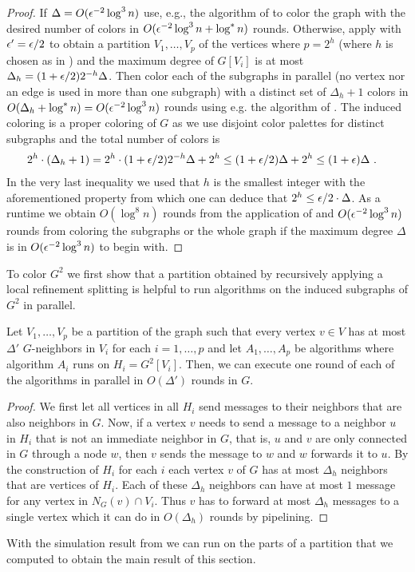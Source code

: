 \begin{proof}
If $\Delta=O(\epsilon^{-2}\log^3 n)$ use, e.g., the algorithm of \cite{BEG18} to color the graph with the desired number of colors in $O(\epsilon^{-2}\log^3 n+\log^* n)$ rounds.
Otherwise, apply  with $\epsilon'=\epsilon/2$ to obtain a partition $V_1,\ldots,V_p$ of the vertices where $p=2^h$ (where $h$ is chosen as in ) and the maximum degree of $G[V_i]$ is at most $\Delta_h=(1+\epsilon/2)2^{-h}\Delta$. 
Then color each of the subgraphs in parallel (no vertex nor an edge is used in more than one subgraph) with a distinct set of $\Delta_h+1$ colors in $O(\Delta_h+\log^* n)=O(\epsilon^{-2}\log^3 n)$ rounds using e.g. the algorithm of \cite{BEG18}. The induced coloring is a proper coloring of $G$ as we use disjoint color palettes for distinct subgraphs and the total number of colors is
\begin{align}
2^h\cdot (\Delta_h+1) & =2^h\cdot (1+\epsilon/2)2^{-h}\Delta+2^h\leq (1+\epsilon/2)\Delta+2^h\leq  (1+\epsilon)\Delta~.
\end{align}
In the very last inequality we used that $h$ is the smallest integer with the aforementioned property from which one can deduce that
$2^h\leq \epsilon/2\cdot \Delta$.
As a runtime we obtain $O(\log^8 n)$ rounds from the application of  and $O(\epsilon^{-2}\log^3 n)$ rounds from coloring the subgraphs or the whole graph if the maximum degree $\Delta$ is in $O(\epsilon^{-2}\log^3 n)$ to begin with.
\end{proof}

To color $G^2$ we first show that a partition obtained by recursively applying a local refinement splitting is helpful to run {\congest} algorithms on the induced  subgraphs of $G^2$ in parallel. 
\begin{lemma} 
\label{lem:CONGESTsimulation}
Let $V_1,\ldots,V_p$ be a partition of the graph such that every vertex $v\in V$ has at most $\Delta'$ $G$-neighbors in $V_i$ for each $i=1,\ldots, p$ and let $A_1, \ldots, A_p$ be algorithms where algorithm $A_i$ runs on $H_i=G^2[V_i]$. 
Then, we can execute one round of each of the algorithms in parallel in $O(\Delta')$ {\congest} rounds in $G$. 
\end{lemma}
\begin{proof}
We first let all vertices in all $H_i$ send messages to their neighbors that are also neighbors in $G$. 
Now, if a vertex $v$ needs to send a message to a neighbor $u$ in $H_i$ that is not an immediate neighbor in $G$, that is, $u$ and $v$ are only connected in $G$ through a node $w$, then $v$ sends the message to $w$ and $w$ forwards it to $u$. By the construction of $H_i$ for each $i$ each vertex $v$ of $G$ has at most $\Delta_h$ neighbors that are vertices of $H_i$. Each of these $\Delta_h$ neighbors can have at most $1$ message for any vertex in $N_G(v)\cap V_i$. Thus $v$ has to forward at most $\Delta_h$ messages to a single vertex which it can do in $O(\Delta_h)$ rounds by pipelining. 
\end{proof}
With the {\congest} simulation result from  we can run  on the parts of a partition that we computed  to obtain the main result of this section.
\smallskip

